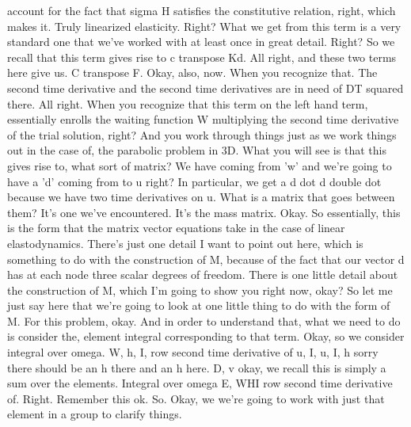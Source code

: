 \documentclass[10pt]{article}
\begin{document}
account for the fact that sigma H satisfies the constitutive relation, right, which makes it. Truly linearized elasticity. Right? What we get from this term is a very standard one that we've worked with at least once in great detail. Right? So we recall that this term gives rise to c transpose Kd. All right, and these two terms here give us. C transpose F. Okay, also, now. When you recognize that. The second time derivative and the second time derivatives are in need of DT squared there. All right. When you recognize that this term on the left hand term, essentially enrolls the waiting function W multiplying the second time derivative of the trial solution, right? And you work through things just as we work things out in the case of, the parabolic problem in 3D. What you will see is that this gives rise to, what sort of matrix? We have coming from 'w' and we're going to have a 'd' coming from to u right? In particular, we get a d dot d double dot because we have two time derivatives on u. What is a matrix that goes between them? It's one we've encountered. It's the mass matrix. Okay. So essentially, this is the form that the matrix vector equations take in the case of linear elastodynamics. There's just one detail I want to point out here, which is something to do with the construction of M, because of the fact that our vector d has at each node three scalar degrees of freedom. There is one little detail about the construction of M, which I'm going to show you right now, okay? So let me just say here that we're going to look at one little thing to do with the form of M. For this problem, okay. And in order to understand that, what we need to do is consider the, element integral corresponding to that term. Okay, so we consider integral over omega. W, h, I, row second time derivative of u, I, u, I, h sorry there should be an h there and an h here. D, v okay, we recall this is simply a sum over the elements. Integral over omega E, WHI row second time derivative of. Right. Remember this ok. So. Okay, we we're going to work with just that element in a group to clarify things.
\end{document}
